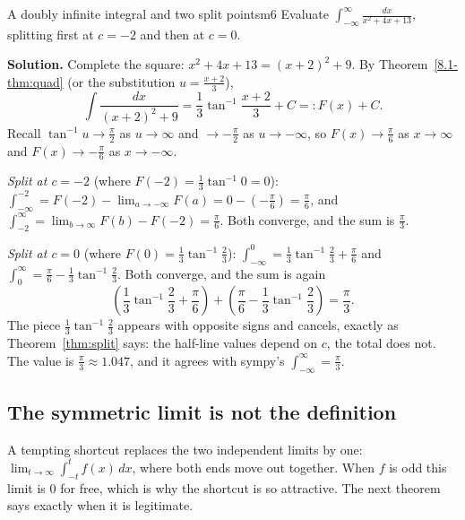 \documentclass[11pt]{article}
\begin{document}
\begin{exmp}{A doubly infinite integral and two split points}{m6}
Evaluate $\displaystyle\int_{-\infty}^\infty\frac{dx}{x^2+4x+13}$, splitting first at $c=-2$ and then at $c=0$.

\textbf{Solution.} Complete the square: $x^2+4x+13=(x+2)^2+9$. By Theorem~\ref{8.1-thm:quad} (or the substitution $u=\frac{x+2}3$),
\[\int\frac{dx}{(x+2)^2+9}=\frac13\tan^{-1}\frac{x+2}3+C=:F(x)+C .\]
Recall $\tan^{-1}u\to\frac\pi2$ as $u\to\infty$ and $\to-\frac\pi2$ as $u\to-\infty$, so $F(x)\to\frac\pi6$ as $x\to\infty$ and $F(x)\to-\frac\pi6$ as $x\to-\infty$.

\emph{Split at $c=-2$} (where $F(-2)=\frac13\tan^{-1}0=0$): $\int_{-\infty}^{-2}=F(-2)-\lim_{a\to-\infty}F(a)=0-\left(-\frac\pi6\right)=\frac\pi6$, and $\int_{-2}^\infty=\lim_{b\to\infty}F(b)-F(-2)=\frac\pi6$. Both converge, and the sum is $\frac\pi3$.

\emph{Split at $c=0$} (where $F(0)=\frac13\tan^{-1}\frac23$): $\int_{-\infty}^0=\frac13\tan^{-1}\frac23+\frac\pi6$ and $\int_0^\infty=\frac\pi6-\frac13\tan^{-1}\frac23$. Both converge, and the sum is again
\[\left(\frac13\tan^{-1}\frac23+\frac\pi6\right)+\left(\frac\pi6-\frac13\tan^{-1}\frac23\right)=\frac\pi3 .\]
The piece $\frac13\tan^{-1}\frac23$ appears with opposite signs and cancels, exactly as Theorem~\ref{thm:split} says: the half-line values depend on $c$, the total does not. The value is $\frac\pi3\approx1.047$, and it agrees with sympy's $\int_{-\infty}^{\infty}=\frac\pi3$.
\end{exmp}

\subsection*{The symmetric limit is not the definition}

A tempting shortcut replaces the two independent limits by one: $\lim_{t\to\infty}\int_{-t}^tf(x)\,dx$, where both ends move out together. When $f$ is odd this limit is $0$ for free, which is why the shortcut is so attractive. The next theorem says exactly when it is legitimate.
\end{document}
